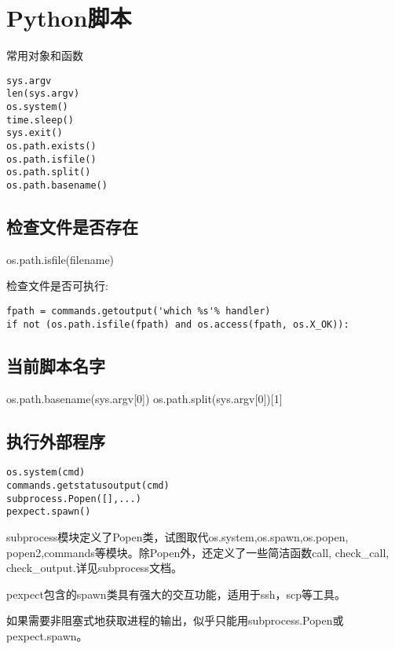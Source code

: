 \section{Python脚本}
常用对象和函数
\begin{verbatim}
sys.argv
len(sys.argv)
os.system()
time.sleep()
sys.exit()
os.path.exists()
os.path.isfile()
os.path.split()
os.path.basename()
\end{verbatim}

\subsection{检查文件是否存在}
os.path.isfile(filename)

检查文件是否可执行:
\begin{verbatim}
fpath = commands.getoutput('which %s'% handler)
if not (os.path.isfile(fpath) and os.access(fpath, os.X_OK)):
\end{verbatim}
\subsection{当前脚本名字}
os.path.basename(sys.argv[0])
os.path.split(sys.argv[0])[1]
\subsection{执行外部程序}
\begin{verbatim}
os.system(cmd)
commands.getstatusoutput(cmd)
subprocess.Popen([],...)
pexpect.spawn()
\end{verbatim}
subprocess模块定义了Popen类，试图取代os.system,os.spawn,os.popen, popen2,commands等模块。除Popen外，还定义了一些简洁函数call, check\_call, check\_output.详见subprocess文档。

pexpect包含的spawn类具有强大的交互功能，适用于ssh，scp等工具。

如果需要非阻塞式地获取进程的输出，似乎只能用subprocess.Popen或pexpect.spawn。

